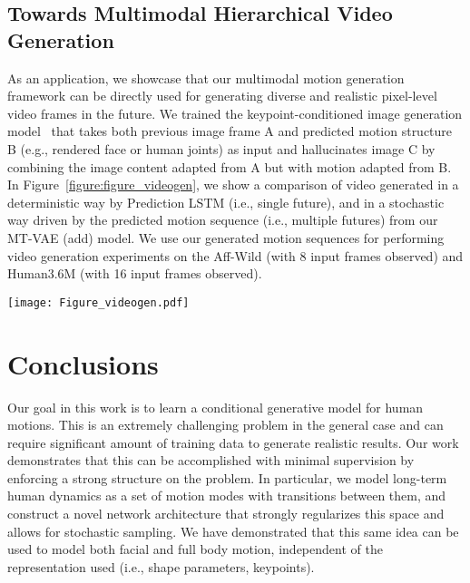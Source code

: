 \documentclass[runningheads]{llncs}
\newcommand{\cutsectionup}{\vspace*{-0.2in}}
\newcommand{\cutsectiondown}{\vspace*{-0.12in}}
\newcommand{\cutsubsectiondown}{\vspace*{-0.07in}}
\begin{document}
\subsection{Towards Multimodal Hierarchical Video Generation}
\cutsubsectiondown

As an application, we showcase that our multimodal motion generation framework can be directly used for generating diverse and realistic pixel-level video frames in the future.
We trained the keypoint-conditioned image generation model~\cite{villegas2017learning} that takes both previous image frame A and predicted motion structure B (e.g., rendered face or human joints) as input and hallucinates image C by combining the image content adapted from A but with motion adapted from B.
In Figure~\ref{figure:figure_videogen}, we show a comparison of video generated in a deterministic way by Prediction LSTM (i.e., single future), and in a stochastic way driven by the predicted motion sequence (i.e., multiple futures) from our MT-VAE (add) model.
We use our generated motion sequences for performing video generation experiments on the Aff-Wild (with 8 input frames observed) and Human3.6M (with 16 input frames observed).


\begin{figure*}[t]
\centering
\texttt{[image: Figure\_videogen.pdf]}
\caption{Multimodal Hierarchical video generation. Top rows: Face video generation results from 8 observed frames.
Bottom rows: Human video generation results from 16 observed frames.
}
\label{figure:figure_videogen}
\vspace*{-0.2in}
\end{figure*}

\cutsectionup
\section{Conclusions}
\cutsectiondown

Our goal in this work is to learn a conditional generative model for human motions. 
This is an extremely challenging problem in the general case and can require significant amount of training data to generate realistic results.
Our work demonstrates that this can be accomplished with minimal supervision by enforcing a strong structure on the problem.
In particular, we model long-term human dynamics as a set of motion modes with transitions between them, and construct a novel network architecture that strongly regularizes this space and allows for stochastic sampling.
We have demonstrated that this same idea can be used to model both facial and full body motion, independent of the representation used (i.e., shape parameters, keypoints).
\end{document}
